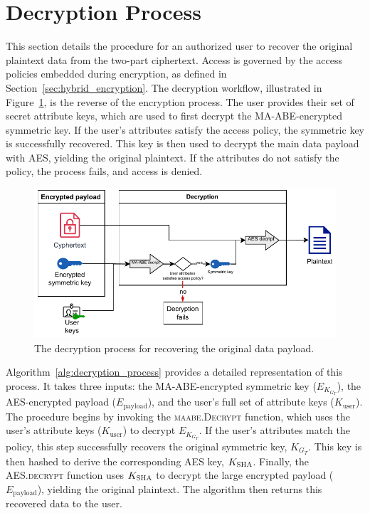 \documentclass[cic,tc,english]{iiufrgs}
\numberwithin{algorithm}{chapter}
\begin{document}
    \section{Decryption Process}
        \label{sec:policy_decryption}

        This section details the procedure for an authorized user to recover the original plaintext data from the two-part ciphertext. Access is governed by the access policies embedded during encryption, as defined in Section~\ref{sec:hybrid_encryption}. The decryption workflow, illustrated in Figure~\ref{fig:decryption_diagram}, is the reverse of the encryption process. The user provides their set of secret attribute keys, which are used to first decrypt the MA-ABE-encrypted symmetric key. If the user's attributes satisfy the access policy, the symmetric key is successfully recovered. This key is then used to decrypt the main data payload with AES, yielding the original plaintext. If the attributes do not satisfy the policy, the process fails, and access is denied.
        
        \begin{figure}[h]
            \centering
            \includegraphics[width=\textwidth]{images/diagrams/decryption_diagram.pdf}
            \caption{The decryption process for recovering the original data payload.}
            \label{fig:decryption_diagram}
        \end{figure}

        Algorithm~\ref{alg:decryption_process} provides a detailed representation of this process. It takes three inputs: the MA-ABE-encrypted symmetric key ($E_{K_{G_T}}$), the AES-encrypted payload ($E_{\text{payload}}$), and the user's full set of attribute keys ($K_{\text{user}}$). The procedure begins by invoking the \textsc{maabe.Decrypt} function, which uses the user's attribute keys ($K_{\text{user}}$) to decrypt $E_{K_{G_T}}$. If the user's attributes match the policy, this step successfully recovers the original symmetric key, $K_{G_T}$. This key is then hashed to derive the corresponding AES key, $K_{\textsc{SHA}}$. Finally, the \textsc{AES.decrypt} function uses $K_{\textsc{SHA}}$ to decrypt the large encrypted payload ($E_{\text{payload}}$), yielding the original plaintext. The algorithm then returns this recovered data to the user.
\end{document}
